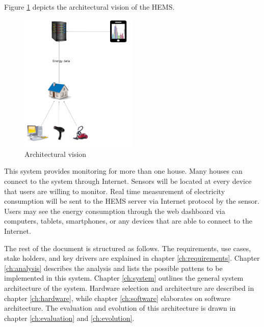 Figure \ref{fig:vision} depicts the architectural vision of the HEMS.

\begin{figure}[H]
	\centering
	\includegraphics[width=0.5\textwidth]{1-context/images/vision.jpg}
	\caption{Architectural vision}
	\label{fig:vision}
\end{figure}

This system provides monitoring for more than one house. Many houses can connect to the system through Internet. Sensors will be located at every device that users are willing to monitor. Real time measurement of electricity consumption will be sent to the HEMS server via Internet protocol by the sensor. Users may see the energy consumption through the web dashboard via computers, tablets, smartphones, or any devices that are able to connect to the Internet.



The rest of the document is structured as follows. The requirements, use cases, stake holders, and key drivers are explained in chapter \ref{ch:requirements}. Chapter \ref{ch:analysis} describes the analysis and lists the possible pattens to be implemented in this system. Chapter \ref{ch:system} outlines the general system architecture of the system. Hardware selection and architecture are described in chapter \ref{ch:hardware}, while chapter \ref{ch:software} elaborates on software architecture. The evaluation and evolution of this architecture is drawn in chapter \ref{ch:evaluation} and \ref{ch:evolution}. 